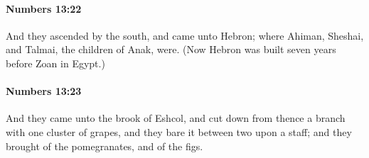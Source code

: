 		\paragraph{Numbers 13:22} %
			\label{NUMBERS-13-22}

			And they ascended by the south, and came unto Hebron; where Ahiman, Sheshai, and Talmai, the children of Anak, were. (Now Hebron was built seven years before Zoan in Egypt.)


		\paragraph{Numbers 13:23} %
			\label{NUMBERS-13-23}

			And they came unto the brook of Eshcol, and cut down from thence a branch with one cluster of grapes, and they bare it between two upon a staff; and they brought of the pomegranates, and of the figs.

